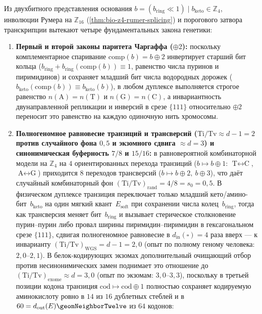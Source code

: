 \begin{theorem}[Законы Чаргаффа, спектр мутаций $7/8$ и $15/16$, эпигенетический стебель $\mathrm{CpG}=7$ и расщепление Менделя]
\label{thm:bio-genetics-chargaff-mendel-mutations}
Из двухбитного представления основания $b = (b_{\mathrm{ring}}\ll 1)\mid b_{\mathrm{keto}} \in \mathbb{Z}_4$, инволюции Румера на $\mathbb{Z}_{16}$ (\cref{thm:bio-z4-rumer-splicing}) и порогового затвора транскрипции вытекают четыре фундаментальных закона генетики:
\begin{enumerate}[leftmargin=*]
\item \textbf{Первый и второй законы паритета Чаргаффа ($\oplus 2$):}
  поскольку комплементарное спаривание $\mathrm{comp}(b) = b\oplus 2$ инвертирует старший бит кольца ($b_{\mathrm{ring}} + b_{\mathrm{ring}}(\mathrm{comp}(b)) \equiv 1$, равенство числа пуринов и пиримидинов) и сохраняет младший бит числа водородных дорожек ($b_{\mathrm{keto}}(\mathrm{comp}(b)) \equiv b_{\mathrm{keto}}(b)$), в любом дуплексе выполняется строгое равенство $n(\text{A}) = n(\text{T})$ и $n(\text{G}) = n(\text{C})$, а инвариантность двунаправленной репликации и инверсий в срезе $\{111\}$ относительно $\oplus 2$ переносит это равенство на каждую одиночную нить хромосомы.
\item \textbf{Полногеномное равновесие транзиций и трансверсий ($\mathrm{Ti}/\mathrm{Tv} \approx d-1 = 2$ против случайного фона $0{,}5$ и экзомного сдвига $\approx d = 3$) и синонимическая буферность $7/8$ и $15/16$:}
  в равновероятной комбинаторной модели на $\mathbb{Z}_4$ на $4$ ориентированных перехода транзиций ($b \mapsto b\oplus 1$: $\text{T}\leftrightarrow\text{C}$, $\text{A}\leftrightarrow\text{G}$) приходится $8$ переходов трансверсий ($b\mapsto b\oplus 2,\ b\oplus 3$), что даёт случайный комбинаторный фон $(\mathrm{Ti}/\mathrm{Tv})_{\mathrm{rand}} = 4/8 = s_0 = 0{,}5$.
  В физическом дуплексе транзиция переключает только младший кето/амино-бит~$b_{\mathrm{keto}}$ на один мягкий квант~$E_{\mathrm{soft}}$ при сохранении числа колец~$b_{\mathrm{ring}}$, тогда как трансверсия меняет бит~$b_{\mathrm{ring}}$ и вызывает стерическое столкновение пурин--пурин либо провал ширины пиримидин--пиримидин в гексагональном срезе $\{111\}$, сдвигая полногеномное равновесие в $d_{\mathrm{in}}(\square) = 4$ раза вверх — к инварианту $(\mathrm{Ti}/\mathrm{Tv})_{\mathrm{WGS}} = d - 1 = 2{,}0$ (опыт по полному геному человека: $2{,}0\text{--}2{,}1$).
  В белок-кодирующих экзомах дополнительный очищающий отбор против несинонимических замен поднимает это отношение до $(\mathrm{Ti}/\mathrm{Tv})_{\mathrm{exome}} \approx d = 3{,}0$ (опыт по экзомам: $3{,}0\text{--}3{,}3$), поскольку в третьей позиции кодона транзиция $\mathrm{cod}\mapsto\mathrm{cod}\oplus 1$ полностью сохраняет кодируемую аминокислоту ровно в $14$ из $16$ дублетных стеблей и в $60 = d_{\mathrm{out}}(E)\geomNeighborTwelve$ из $64$ кодонов:

\end{enumerate}
\end{theorem}
